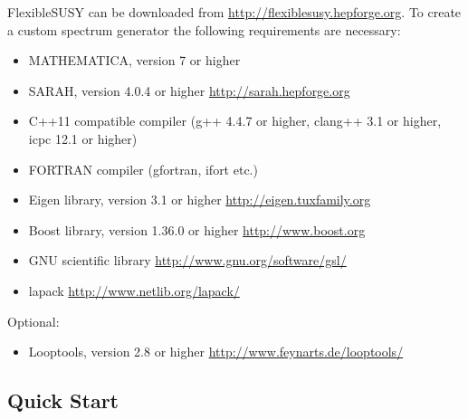 \documentclass[final,3p,11pt,pdflatex]{elsarticle}
\newcommand{\fs}{FlexibleSUSY\xspace}
\begin{document}
\fs can be downloaded from \url{http://flexiblesusy.hepforge.org}.  To
create a custom spectrum generator the following requirements are
necessary:
%
\begin{itemize}
\item MATHEMATICA, version 7 or higher
\item SARAH, version 4.0.4 or higher \url{http://sarah.hepforge.org}
\item C++11 compatible compiler (g++ 4.4.7 or higher, clang++ 3.1 or
  higher, icpc 12.1 or higher)
\item FORTRAN compiler (gfortran, ifort etc.)
\item Eigen library, version 3.1 or higher
  \url{http://eigen.tuxfamily.org}
\item Boost library, version 1.36.0 or higher
  \url{http://www.boost.org}
\item GNU scientific library \url{http://www.gnu.org/software/gsl/}
\item lapack \url{http://www.netlib.org/lapack/}
\end{itemize}
%
Optional:
%
\begin{itemize}
\item Looptools, version 2.8 or higher
  \url{http://www.feynarts.de/looptools/}
\end{itemize}

\subsection{Quick Start}
\end{document}
